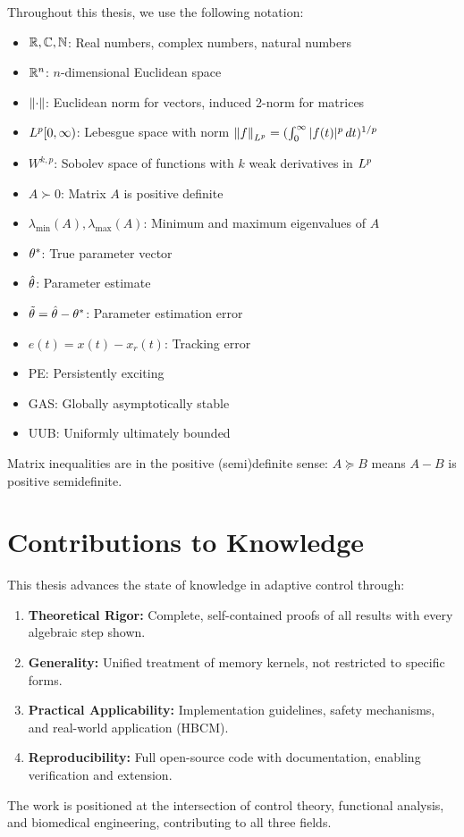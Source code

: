 Throughout this thesis, we use the following notation:
\begin{itemize}
    \item $\mathbb{R}, \mathbb{C}, \mathbb{N}$: Real numbers, complex numbers, natural numbers
    \item $\mathbb{R}^n$: $n$-dimensional Euclidean space
    \item $\left\| \cdot \right\|$: Euclidean norm for vectors, induced 2-norm for matrices
    \item $L^{p}[0,\infty)$: Lebesgue space with norm $\left\| f \right\|_{L^{p}} = (\int_0^\infty |f(t)|^p \, dt)^{1/p}$
    \item $W^{k,p}$: Sobolev space of functions with $k$ weak derivatives in $L^{p}$
    \item $A \succ 0$: Matrix $A$ is positive definite
    \item $\lambda_{\min}(A), \lambda_{\max}(A)$: Minimum and maximum eigenvalues of $A$
    \item $\theta^*$: True parameter vector
    \item $\hat{\theta}$: Parameter estimate
    \item $\tilde{\theta} = \hat{\theta} - \theta^*$: Parameter estimation error
    \item $e(t) = x(t) - x_r(t)$: Tracking error
    \item PE: Persistently exciting
    \item GAS: Globally asymptotically stable
    \item UUB: Uniformly ultimately bounded
\end{itemize}

Matrix inequalities are in the positive (semi)definite sense: $A \succeq B$ means $A - B$ is positive semidefinite.

\section{Contributions to Knowledge}

This thesis advances the state of knowledge in adaptive control through:
\begin{enumerate}
    \item \textbf{Theoretical Rigor:} Complete, self-contained proofs of all results with every algebraic step shown.
    \item \textbf{Generality:} Unified treatment of memory kernels, not restricted to specific forms.
    \item \textbf{Practical Applicability:} Implementation guidelines, safety mechanisms, and real-world application (HBCM).
    \item \textbf{Reproducibility:} Full open-source code with documentation, enabling verification and extension.
\end{enumerate}

The work is positioned at the intersection of control theory, functional analysis, and biomedical engineering, contributing to all three fields.
